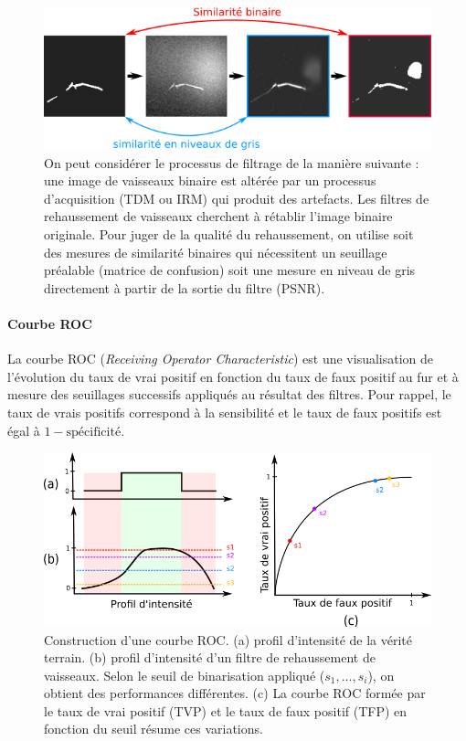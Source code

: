 \begin{figure}[!ht]
  \centering
  \includegraphics[width=\textwidth]{Images/similarity_procedure.png}
  \caption{On peut considérer le processus de filtrage de la manière suivante : une image de vaisseaux binaire est altérée par un processus d'acquisition (TDM ou IRM) qui produit des artefacts. Les filtres de rehaussement de vaisseaux cherchent à rétablir l'image binaire originale. Pour juger de la qualité du rehaussement, on utilise soit des mesures de similarité binaires qui nécessitent un seuillage préalable (matrice de confusion) soit une mesure en niveau de gris directement à partir de la sortie du filtre (PSNR).}
  \label{fig:custom_fig}
\end{figure}


\paragraph{Courbe ROC}

La courbe ROC (\textit{Receiving Operator Characteristic}) est une visualisation de l'évolution du taux de vrai positif en fonction du taux de faux positif au fur et à mesure des seuillages successifs appliqués au résultat des filtres. Pour rappel, le taux de vrais positifs correspond à la sensibilité et le taux de faux positifs est égal à $1-\text{spécificité}$. 

\begin{figure}[!ht]
  \centering
  \includegraphics[width=\textwidth]{Images/roc_example.png}
  \caption{Construction d'une courbe ROC. (a) profil d'intensité de la vérité terrain. (b) profil d'intensité d'un filtre de rehaussement de vaisseaux. Selon le seuil de binarisation appliqué ($s_1,...,s_i$), on obtient des performances différentes. (c) La courbe ROC formée par le taux de vrai positif (TVP) et le taux de faux positif (TFP) en fonction du seuil résume ces variations.}
  \label{fig:roc_example}
\end{figure}


